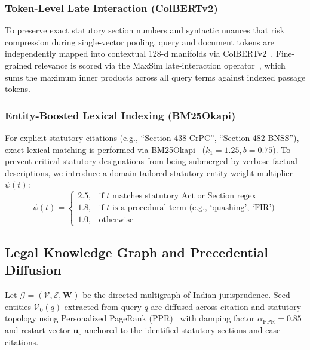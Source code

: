 \documentclass[conference]{IEEEtran}
\begin{document}
\subsubsection{Token-Level Late Interaction (ColBERTv2)}
To preserve exact statutory section numbers and syntactic nuances that risk compression during single-vector pooling, query and document tokens are independently mapped into contextual 128-d manifolds via ColBERTv2~\cite{santhanam2022colbertv2}. Fine-grained relevance is scored via the MaxSim late-interaction operator~\cite{khattab2020colbert}, which sums the maximum inner products across all query terms against indexed passage tokens.

\subsubsection{Entity-Boosted Lexical Indexing (BM25Okapi)}
For explicit statutory citations (e.g., ``Section 438 CrPC'', ``Section 482 BNSS''), exact lexical matching is performed via BM25Okapi~\cite{robertson1994okapi} ($k_1 = 1.25, b = 0.75$). To prevent critical statutory designations from being submerged by verbose factual descriptions, we introduce a domain-tailored statutory entity weight multiplier $\psi(t)$:
\begin{equation}
\psi(t) = \begin{cases}
2.5, & \text{if } t \text{ matches statutory Act or Section regex} \\
1.8, & \text{if } t \text{ is a procedural term (e.g., `quashing', `FIR')} \\
1.0, & \text{otherwise}
\end{cases}
\end{equation}

\subsection{Legal Knowledge Graph and Precedential Diffusion}
Let $\mathcal{G} = (\mathcal{V}, \mathcal{E}, \mathbf{W})$ be the directed multigraph of Indian jurisprudence. Seed entities $\mathcal{V}_0(q)$ extracted from query $q$ are diffused across citation and statutory topology using Personalized PageRank (PPR)~\cite{page1999pagerank} with damping factor $\alpha_{\text{PPR}} = 0.85$ and restart vector $\mathbf{u}_0$ anchored to the identified statutory sections and case citations.
\end{document}
